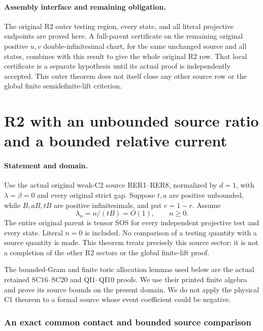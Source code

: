 \paragraph{Assembly interface and remaining obligation.}
The original R2 outer testing region, every state, and all literal
projective endpoints are proved here.  A full-parent certificate on the
remaining original positive $u,v$ double-infinitesimal chart, for the
same unchanged source and all states, combines with this result to give
the whole original R2 row.  That local certificate is a separate
hypothesis until its actual proof is independently accepted.  This
outer theorem does not itself close any other source row or the global
finite semidefinite-lift criterion.


\section{\texorpdfstring{R2 with an unbounded source ratio and a bounded relative current}{R2 with an unbounded source ratio and a bounded relative current}}
\label{component:pb88ccd68a4bf}

\label{pb88ccd68a4bf:sec:r2-thin-new}

\paragraph{Statement and domain.}
Use the actual original weak-C2 source RER1--RER8, normalized by
$d=1$, with $\lambda=\beta=0$ and every original strict gap.
Suppose $t,a$ are positive unbounded, while $B,aB,tB$ are
positive infinitesimals, and put $e=1-r$.  Assume
\[
             \lambda_n=n/(tB)=O(1),\qquad n\geq0.       \tag{TU1}
\]
The entire original parent is tensor SOS for every independent
projective test and every state.  Literal $n=0$ is included.
No comparison of a testing quantity with a source quantity is made.
This theorem treats precisely this source sector; it is not a
completion of the other R2 sectors or the global finite-lift proof.

The bounded-Gram and finite toric allocation lemmas used below are
the actual retained SC16--SC20 and QI1--QI10 proofs.  We use their
printed finite algebra and prove its source bounds on the present
domain.  We do not apply the physical C1 theorem to a formal source
whose event coefficient could be negative.

\subsubsection*{An exact common contact and bounded source comparison}

